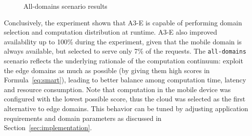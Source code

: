 \begin{figure}[htb]
\centering
	\captionsetup[subfigure]{width=0.32\textwidth}
	\captionsetup[subfigure]{width=0.32\textwidth}
	\captionsetup[subfigure]{width=0.32\textwidth}
	
	\caption{All-domains scenario results} \label{fig:all-domains}
\end{figure}

Conclusively, the experiment shown that A3-E is capable of performing domain selection and computation distribution at runtime. A3-E also improved availability up to 100\% during the experiment, given that the mobile domain is always available, but selected to serve only 7\% of the requests.
The \texttt{all-domains} scenario reflects the underlying rationale of the computation continuum: exploit the edge domains as much as possible (by giving them high scores in Formula~\ref{eq:smart}), leading to better balance among computation time, latency and resource consumption. 
Note that computation in the mobile device was configured with the lowest possible score, thus the cloud was selected as the first alternative to edge domains. This behavior can be tuned by adjusting application requirements and domain parameters as discussed in Section~\ref{sec:implementation}.

